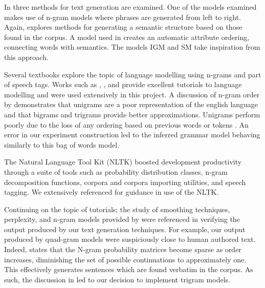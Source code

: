 \documentclass[ai15_group61_report.tex]{subfiles}
\begin{document}

In \cite{Ratnaparkhi00} three methods for text generation are examined. One of the models examined makes use of n-gram models where phrases are generated from left to right. Again, \cite{Ratnaparkhi00} explores methods for generating a semantic structure based on those found in the corpus. A model used in \cite{Ratnaparkhi00} creates an automatic attribute ordering, connecting words with semantics. The models IGM and SM take inspiration from this approach. 

Several textbooks explore the topic of language modelling using n-grams and part of speech tags. Works such as \cite{Jurafsky2000}, \cite{RussellNorvigAIBook3rd}, and \cite{Chen98anempirical} provide excellent tutorials to language modelling and were used extensively in this project. A discussion of n-gram order by \cite{RussellNorvigAIBook3rd} demonstrates that unigrams are a poor representation of the english language and that bigrams and trigrams provide better approximations. Unigrams perform poorly due to the loss of any ordering based on previous words or tokens \cite{RussellNorvigAIBook3rd}. An error in our experiment construction led to the inferred grammar model behaving similarly to this bag of words model.

The Natural Language Tool Kit (NLTK) boosted development productivity through a suite of tools such as probability distribution classes, n-gram decomposition functions, corpora and corpora importing utilities, and speech tagging. We extensively referenced \cite{NLTKBook09} for guidance in use of the NLTK. 

Continuing on the topic of tutorials; the study of smoothing techniques, perplexity, and n-gram models provided by \cite{Jurafsky2000} were referenced in verifying the output produced by our text generation techniques. For example, our output produced by quad-gram models were suspiciously close to human authored text. Indeed, \cite{Jurafsky2000} states that the N-gram probability matrices become sparse as order increases, diminishing the set of possible continuations to approximately one. This effectively generates sentences which are found verbatim in the corpus. As such, the discussion in \cite{Jurafsky2000} led to our decision to implement trigram models. 
\end{document}
